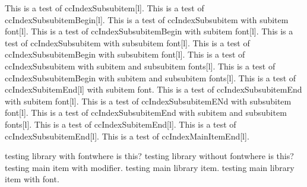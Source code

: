 \documentclass{article}
\begin{document}
{{{{This is a test of ccIndexSubsubitem[l].
This is a test of ccIndexSubsubitemBegin[l].
This is a test of ccIndexSubsubitem with subitem font[l].
This is a test of ccIndexSubsubitemBegin with subitem font[l].
This is a test of ccIndexSubsubitem with subsubitem font[l].
This is a test of ccIndexSubsubitemBegin with subsubitem font[l].
This is a test of ccIndexSubsubitem with subitem and subsubitem fonts[l].
This is a test of ccIndexSubsubitemBegin with subitem and subsubitem fonts[l].
\pagebreak
This is a test of ccIndexSubitemEnd[l] with subitem font.
This is a test of ccIndexSubsubitemEnd with subitem font[l].
This is a test of ccIndexSubsubitemENd with subsubitem font[l].
This is a test of ccIndexSubsubitemEnd with subitem and subsubitem fonts[l].
This is a test of ccIndexSubitemEnd[l].
This is a test of ccIndexSubsubitemEnd[l].
This is a test of ccIndexMainItemEnd[l].

testing library with fontwhere is this?
testing library without fontwhere is this?
testing main item with modifier.
testing main library item.
testing main library item with font.

}}}}
\end{document}
